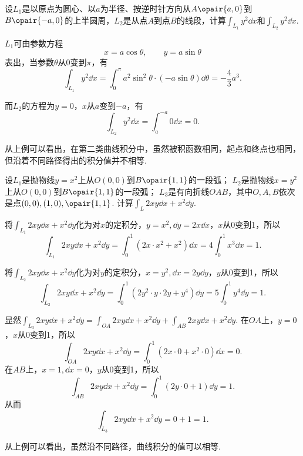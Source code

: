 \begin{example}
设\(L_1\)是以原点为圆心、以\(a\)为半径、按逆时针方向从\(A\opair{a,0}\)到\(B\opair{-a,0}\)的上半圆周，\(L_2\)是从点\(A\)到点\(B\)的线段，计算\(\int_{L_1} y^2 \dd{x}\)和\(\int_{L_2} y^2 \dd{x}\).
\begin{solution}
\(L_1\)可由参数方程\[
x = a \cos\theta, \qquad y = a \sin\theta
\]表出，当参数\(\theta\)从\(0\)变到\(\pi\)，有\[
\int_{L_1} y^2 \dd{x}
= \int_0^{\pi} a^2 \sin^2 \theta \cdot (-a \sin\theta) \dd{\theta}
= -\frac{4}{3} a^3.
\]

而\(L_2\)的方程为\(y=0\)，\(x\)从\(a\)变到\(-a\)，有\[
\int_{L_2} y^2 \dd{x} = \int_a^{-a} 0 \dd{x} = 0.
\]
\end{solution}
\end{example}
从上例可以看出，在第二类曲线积分中，虽然被积函数相同，起点和终点也相同，但沿着不同路径得出的积分值并不相等.

\begin{example}
设\(L_1\)是抛物线\(y=x^2\)上从\(O(0,0)\)到\(B\opair{1,1}\)的一段弧；
\(L_2\)是抛物线\(x=y^2\)上从\(O(0,0)\)到\(B\opair{1,1}\)的一段弧；
\(L_3\)是有向折线\(OAB\)，其中\(O,A,B\)依次是点\((0,0),(1,0),\opair{1,1}\).
计算\(\int_L 2xy\dd{x}+x^2\dd{y}\).
\begin{solution}
将\(\int_{L_1} 2xy\dd{x}+x^2\dd{y}\)化为对\(x\)的定积分，\(y=x^2, \dd{y}=2x\dd{x}\)，\(x\)从0变到1，所以\[
\int_{L_1} 2xy\dd{x}+x^2\dd{y}
= \int_0^1 (2x \cdot x^2 + x^2) \dd{x}
= 4 \int_0^1 x^3 \dd{x} = 1.
\]

将\(\int_{L_2} 2xy\dd{x}+x^2\dd{y}\)化为对\(y\)的定积分，\(x=y^2, \dd{x}=2y\dd{y}\)，\(y\)从0变到1，所以\[
\int_{L_2} 2xy\dd{x}+x^2\dd{y}
= \int_0^1 (2y^2 \cdot y \cdot 2y + y^4) \dd{y}
= 5 \int_0^1 y^4 \dd{y} = 1.
\]

显然\(\int_{L_3} 2xy\dd{x}+x^2\dd{y} = \int_{OA} 2xy\dd{x}+x^2\dd{y} + \int_{AB} 2xy\dd{x}+x^2\dd{y}\).
在\(OA\)上，\(y=0\)，\(x\)从0变到1，所以\[
\int_{OA} 2xy\dd{x}+x^2\dd{y}
= \int_0^1 (2x\cdot0+x^2\cdot0) \dd{x} = 0.
\]
在\(AB\)上，\(x=1, \dd{x}=0\)，\(y\)从0变到1，所以\[
\int_{AB} 2xy\dd{x}+x^2\dd{y}
= \int_0^1 (2y\cdot0+1) \dd{y} = 1.
\]从而\[
\int_{L_3} 2xy\dd{x}+x^2\dd{y} = 0 + 1 = 1.
\]
\end{solution}
\end{example}
从上例可以看出，虽然沿不同路径，曲线积分的值可以相等.

